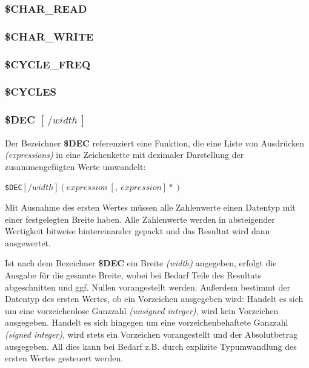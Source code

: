 \documentclass{scrartcl}
\begin{document}
\subsubsection{\$CHAR\_READ}

\subsubsection{\$CHAR\_WRITE}

\subsubsection{\$CYCLE\_FREQ}

\subsubsection{\$CYCLES}

\subsubsection{\$DEC $[~/width~]$}

\noindent Der Bezeichner \textbf{\$DEC} referenziert eine Funktion, die eine Liste von Ausdrücken \textit{(expressions)} in eine Zeichenkette mit dezimaler Darstellung der zusammengefügten Werte umwandelt:

\vspace{10pt}
\texttt{\$DEC$[/width](expression~[,~expression]*)$}

\vspace{10pt}
\noindent Mit Ausnahme des ersten Wertes müssen alle Zahlenwerte einen Datentyp mit einer festgelegten Breite haben. Alle Zahlenwerte werden in absteigender Wertigkeit bitweise hintereinander gepackt und das Resultat wird dann ausgewertet.

\vspace{10pt}
\noindent Ist nach dem Bezeichner \textbf{\$DEC} ein Breite \textit{(width)} angegeben, erfolgt die Ausgabe für die gesamte Breite, wobei bei Bedarf Teile des Resultats abgeschnitten und ggf. Nullen vorangestellt werden. Außerdem bestimmt der Datentyp des ersten Wertes, ob ein Vorzeichen ausgegeben wird: Handelt es sich um eine vorzeichenlose Ganzzahl \textit{(unsigned integer)}, wird kein Vorzeichen ausgegeben. Handelt es sich hingegen um eine vorzeichenbehaftete Ganzzahl \textit{(signed integer)}, wird stets ein Vorzeichen vorangestellt und der Absolutbetrag ausgegeben. All dies kann bei Bedarf z.B. durch explizite Typumwandlung des ersten Wertes gesteuert werden.
\end{document}
